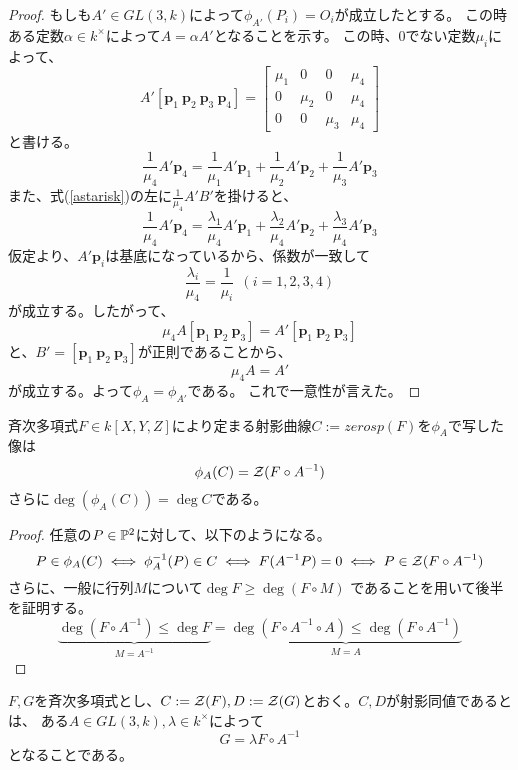 \documentclass[a4paper]{jsarticle}
\begin{document}
\begin{proof}
    もしも$A' \in GL(3,k)$によって$\phi_{A'}(P_i)=O_i$が成立したとする。
    この時ある定数$\alpha \in k^{\times}$によって$A=\alpha A'$となることを示す。
    この時、0でない定数$\mu_i$によって、
    \[
        A'[\mathbf{p}_1~\mathbf{p}_2~\mathbf{p}_3~\mathbf{p}_4]
        =
        \begin{bmatrix}
            \mu_1& 0& 0& \mu_4 \\
            0& \mu_2& 0& \mu_4 \\
            0& 0& \mu_3& \mu_4
        \end{bmatrix}
    \]
    と書ける。
    \[ \frac{1}{\mu_4}A'\mathbf{p}_4=\frac{1}{\mu_1}A'\mathbf{p}_1+\frac{1}{\mu_2}A'\mathbf{p}_2+\frac{1}{\mu_3}A'\mathbf{p}_3 \]
    また、式(\ref{astarisk})の左に$\frac{1}{\mu_4} A'B'$を掛けると、
    \[ \frac{1}{\mu_4}A'\mathbf{p}_4=\frac{\lambda_1}{\mu_4}A'\mathbf{p}_1+\frac{\lambda_2}{\mu_4}A'\mathbf{p}_2+\frac{\lambda_3}{\mu_4}A'\mathbf{p}_3 \]
    仮定より、$A'\mathbf{p}_i$は基底になっているから、係数が一致して
    \[ \frac{\lambda_i}{\mu_4}=\frac{1}{\mu_i} ~~(i=1,2,3,4) \]
    が成立する。したがって、
    \[ \mu_4 A [\mathbf{p}_1~\mathbf{p}_2~\mathbf{p}_3]=A'[\mathbf{p}_1~\mathbf{p}_2~\mathbf{p}_3] \]
    と、$B'=[\mathbf{p}_1~\mathbf{p}_2~\mathbf{p}_3]$が正則であることから、
    \[ \mu_4 A=A' \]
    が成立する。よって$\phi_A=\phi_{A'}$である。
    これで一意性が言えた。
    
\end{proof}

\begin{Lemma}
    斉次多項式$F \in k[X, Y, Z]$により定まる射影曲線$C:=zerosp(F)$を$\phi_A$で写した像は
    \[\phi_A(C)=\mathcal{Z}(F \circ A^{-1}) \]
    さらに$\deg(\phi_A(C))=\deg C$である。
\end{Lemma}
\begin{proof}
    任意の$P \in \mathbb{P}^2$に対して、以下のようになる。
    \[ P \in \phi_A(C) \iff \phi^{-1}_A(P) \in C \iff F(A^{-1} P)=0 \iff P \in \mathcal{Z}(F \circ A^{-1}) \]
    さらに、一般に行列$M$について$\deg F \geq \deg (F \circ M)$
    であることを用いて後半を証明する。
    \[
        \underbrace{\deg (F \circ A^{-1}) \leq \deg F}_{M=A^{-1}}
        =
        \underbrace{\deg (F \circ A^{-1} \circ A) \leq \deg(F \circ A^{-1})}_{M=A}
    \]
    
\end{proof}

\begin{Def}
    $F, G$を斉次多項式とし、$C:=\mathcal{Z}(F), D:=\mathcal{Z}(G)$とおく。$C,D$が射影同値であるとは、
    ある$A \in GL(3,k), \lambda \in k^{\times}$によって
    \[ G=\lambda F \circ A^{-1} \]
    となることである。
\end{Def}
\end{document}
